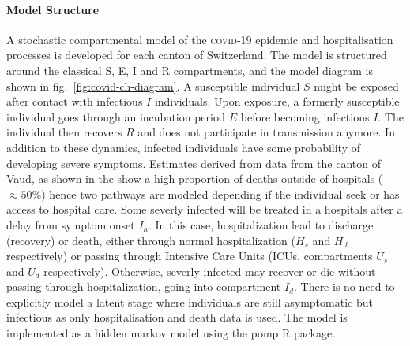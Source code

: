 \paragraph{Model Structure} A stochastic compartmental model of the \textsc{covid}-19 epidemic and hospitalisation processes is developed for each canton of Switzerland. The model is structured around the classical S, E, I and R compartments\cite{Kermack:ContributionMathematicalTheory:1927}, and the model diagram is shown in fig.~\ref{fig:covid-ch-diagram}. %
A susceptible individual $S$ might be exposed after contact with infectious $I$ individuals. Upon exposure, a formerly susceptible individual goes through an incubation period $E$ before becoming infectious $I$. The individual then recovers $R$ and does not participate in transmission anymore. 
In addition to these dynamics, infected individuals have some probability of developing severe symptoms. Estimates derived from data from the canton of Vaud, as shown in the  show a high proportion of deaths outside of hospitals ($\approx 50\%$) hence two pathways are modeled depending if the individual seek  or has access to hospital care.  Some severly infected will be treated in a hospitals after a delay from symptom onset $I_h$. In this case, hospitalization lead to discharge (recovery) or death, either through normal hospitalization ($H_{s}$ and $H_d$ respectively) or passing through Intensive Care Units (ICUs, compartments $U_{s}$ and $U_d$ respectively). Otherwise, severly infected may recover or die without passing through hospitalization, going into compartment $I_d$. There is no need to explicitly model a latent stage where individuals are still asymptomatic but infectious\cite[-8\baselineskip]{Ganyani:EstimatingGenerationInterval:2020,He:TemporalDynamicsViral:2020, Liu:ContributionPresymptomaticInfection:2020} as only hospitalisation and death data is used. The model is implemented as a hidden markov model using the pomp R package\cite[-3\baselineskip]{King:StatisticalInferencePartially:2015}. 
